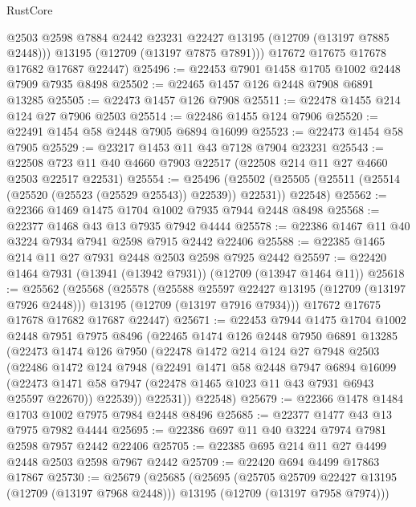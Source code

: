 \begin{lexlean}{RustCore}
\begin{coremodule}
          @2503
          @2598
          @7884
          @2442
          @23231
          @22427
          @13195
          (@12709 (@13197 @7885 @2448)))
        @13195
        (@12709 (@13197 @7875 @7891)))
      @17672
      @17675
      @17678
      @17682
      @17687
      @22447)
@25496 := @22453 @7901 @1458 @1705 @1002 @2448 @7909 @7935 @8498
@25502 := @22465 @1457 @126 @2448 @7908 @6891 @13285
@25505 := @22473 @1457 @126 @7908
@25511 := @22478 @1455 @214 @124 @27 @7906 @2503
@25514 := @22486 @1455 @124 @7906
@25520 := @22491 @1454 @58 @2448 @7905 @6894 @16099
@25523 := @22473 @1454 @58 @7905
@25529 := @23217 @1453 @11 @43 @7128 @7904 @23231
@25543 := @22508 @723 @11 @40 @4660 @7903 @22517 (@22508 @214 @11 @27 @4660 @2503 @22517 @22531)
@25554 := @25496
    (@25502 (@25505 (@25511 (@25514 (@25520 (@25523 (@25529 @25543)) @22539)) @22531)) @22548)
@25562 := @22366 @1469 @1475 @1704 @1002 @7935 @7944 @2448 @8498
@25568 := @22377 @1468 @43 @13 @7935 @7942 @4444
@25578 := @22386 @1467 @11 @40 @3224 @7934 @7941 @2598 @7915 @2442 @22406
@25588 := @22385 @1465 @214 @11 @27 @7931 @2448 @2503 @2598 @7925 @2442
@25597 := @22420 @1464 @7931 (@13941 (@13942 @7931)) (@12709 (@13947 @1464 @11))
@25618 := @25562
    (@25568
      (@25578
        (@25588 @25597 @22427 @13195 (@12709 (@13197 @7926 @2448)))
        @13195
        (@12709 (@13197 @7916 @7934)))
      @17672
      @17675
      @17678
      @17682
      @17687
      @22447)
@25671 := @22453
    @7944
    @1475
    @1704
    @1002
    @2448
    @7951
    @7975
    @8496
    (@22465
      @1474
      @126
      @2448
      @7950
      @6891
      @13285
      (@22473
        @1474
        @126
        @7950
        (@22478
          @1472
          @214
          @124
          @27
          @7948
          @2503
          (@22486
            @1472
            @124
            @7948
            (@22491
              @1471
              @58
              @2448
              @7947
              @6894
              @16099
              (@22473 @1471 @58 @7947 (@22478 @1465 @1023 @11 @43 @7931 @6943 @25597 @22670))
              @22539))
          @22531))
      @22548)
@25679 := @22366 @1478 @1484 @1703 @1002 @7975 @7984 @2448 @8496
@25685 := @22377 @1477 @43 @13 @7975 @7982 @4444
@25695 := @22386 @697 @11 @40 @3224 @7974 @7981 @2598 @7957 @2442 @22406
@25705 := @22385 @695 @214 @11 @27 @4499 @2448 @2503 @2598 @7967 @2442
@25709 := @22420 @694 @4499 @17863 @17867
@25730 := @25679
    (@25685
      (@25695
        (@25705 @25709 @22427 @13195 (@12709 (@13197 @7968 @2448)))
        @13195
        (@12709 (@13197 @7958 @7974)))

\end{coremodule}
\end{lexlean}

